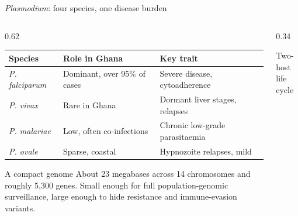 \documentclass[aspectratio=169,11pt]{beamer}
\begin{document}
\begin{frame}{\emph{Plasmodium}: four species, one disease burden}
  \small
  \begin{columns}[c]
    \begin{column}{0.62\textwidth}
      \begin{table}
        \begin{tabular}{@{}p{1.9cm}p{2.6cm}p{3.4cm}@{}}
          \toprule
          \textbf{Species} & \textbf{Role in Ghana} & \textbf{Key trait} \\
          \midrule
          \emph{P. falciparum} & Dominant, over 95\% of cases & Severe disease, cytoadherence \\
          \emph{P. vivax} & Rare in Ghana & Dormant liver stages, relapses \\
          \emph{P. malariae} & Low, often co-infections & Chronic low-grade parasitaemia \\
          \emph{P. ovale} & Sparse, coastal & Hypnozoite relapses, mild \\
          \bottomrule
        \end{tabular}
      \end{table}
      \begin{block}{A compact genome}
        About 23 megabases across 14 chromosomes and roughly 5{,}300 genes.
        Small enough for full population-genomic surveillance, large enough to
        hide resistance and immune-evasion variants.
      \end{block}
    \end{column}
    \begin{column}{0.34\textwidth}
      \begin{block}{Two-host life cycle}
        \begin{center}
        \end{center}
      \end{block}
    \end{column}
  \end{columns}
\end{frame}
\end{document}
